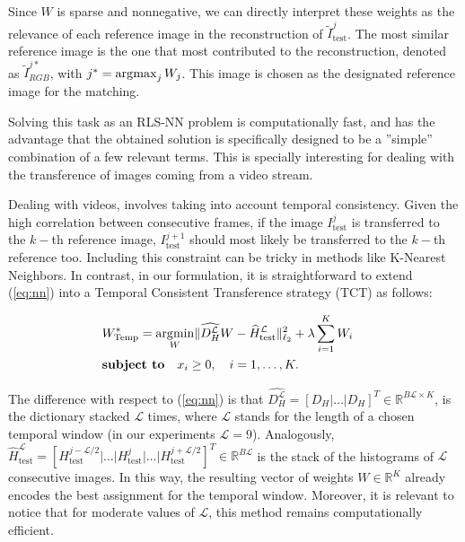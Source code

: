 Since $W$ is sparse and nonnegative, we can directly interpret
these weights as the relevance of each reference image in the
reconstruction of $\tilde{I}^j_\text{test}$. The most similar
reference image is the one that most contributed to the
reconstruction, denoted as $\tilde{I}^{j*}_{RGB}$, with $j^* = \operatorname*{\arg\!\max}_j
W_j $. This image is chosen as the designated reference image for
the matching.



Solving this task as an RLS-NN problem is computationally fast,
and has the advantage that the obtained solution is specifically
designed to be a ''simple'' combination of a few relevant terms.
This is specially interesting for dealing with the transference of
images coming from a video stream.

Dealing with videos, involves taking into account temporal
consistency. Given the high correlation between consecutive
frames, if the image $I^j_\text{test}$ is transferred to the
$k-$th reference image, $I^{j+1}_\text{test}$ should most likely
be transferred to the $k-$th reference too. Including this
constraint can be tricky in methods like K-Nearest Neighbors. In
contrast, in our formulation, it is straightforward to extend
(\ref{eq:nn}) into a Temporal Consistent Transference strategy
(TCT) as follows:

\begin{ceqn}
\begin{eqnarray}
\label{eq:nn2}
& W_\text{Temp}^* = \operatorname*{\arg\!\min}_W \lVert\widehat{D^\mathcal{L}_H} W - \widehat{H}^\mathcal{L}_\text{test}\rVert^2_{\ell_2} + \lambda  \sum_{i=1}^K {W_i} &\\
& \textbf{subject to} \quad x_i \geq 0, \quad i=1, \dots, K. &\nonumber
\end{eqnarray}
\end{ceqn}

The difference with respect to (\ref{eq:nn}) is that
$\widehat{D^\mathcal{L}_H} = [D_H |\dots|D_H]^T \in \mathbb{R}^{B
\mathcal{L} \times K}$, is the dictionary stacked $\mathcal{L}$
times, where $\mathcal{L}$ stands for the length of a chosen
temporal window (in our experiments $\mathcal{L}=9$). Analogously,
$\widehat{H}^\mathcal{L}_\text{test} =
[H^{j-\mathcal{L}/2}_\text{test} |\dots|H^{j}_\text{test} |\dots|
H^{j+\mathcal{L}/2}_\text{test}]^T \in \mathbb{R}^{B \mathcal{L}}$
is the stack of the histograms of $\mathcal{L}$ consecutive
images. In this way, the resulting vector of weights $W \in
\mathbb{R}^K$ already encodes the best assignment for the temporal
window. Moreover, it is relevant to notice that for moderate
values of $\mathcal{L}$, this method remains computationally
efficient.

